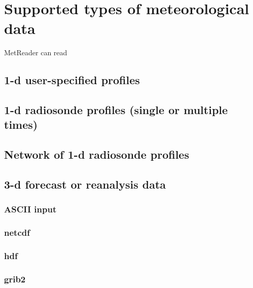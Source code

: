 \documentclass[11pt]{article}   %
\begin{document}
\section{Supported types of meteorological data}
MetReader can read 
\subsection{1-d user-specified profiles}
\subsection{1-d radiosonde profiles (single or multiple times)}
\subsection{Network of 1-d radiosonde profiles}
\subsection{3-d forecast or reanalysis data}
\subsubsection{ASCII input}
\subsubsection{netcdf}
\subsubsection{hdf}
\subsubsection{grib2}


\end{document}

